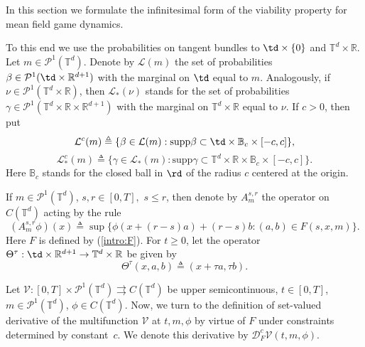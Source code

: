 \documentclass[a4paper,12pt]{article}
\newcommand{\rdp}{\mathbb{R}^{d+1}}
\newcommand{\tdr}{\mathbb{T}^{d}\times\mathbb{R}}
\newcommand{\ptd}{\mathcal{P}^1(\mathbb{T}^d)}
\begin{document}
In this section we formulate the infinitesimal form of the viability property for mean field game dynamics.

To this end we use the probabilities on tangent bundles to $\td\times\{0\}$ and $\tdr$. Let $m\in\ptd$. Denote by $\mathcal{L}(m)$ the set of probabilities $\beta\in\mathcal{P}^1(\td\times\rdp)$ with the marginal on $\td$ equal to $m$. Analogously, if $\nu\in\mathcal{P}^1(\tdr)$, then $\mathcal{L}_*(\nu)$ stands for the set of probabilities $\gamma\in\mathcal{P}^1(\tdr\times \rdp)$ with the marginal on $\tdr$ equal to $\nu$. If $c>0$, then put 
\begin{equation}\label{intro:L_c}
\mathcal{L}^c(m)\triangleq \{\beta\in\mathcal{L}(m):\mathrm{supp}\beta\subset \td\times \mathbb{B}_c\times [-c,c]\},
\end{equation} 
\begin{equation}\label{intro:L_star_c}
\mathcal{L}^c_*(m)\triangleq \{\gamma\in\mathcal{L}_*(m):\mathrm{supp}\gamma\subset \tdr\times \mathbb{B}_c\times [-c,c]\}.
\end{equation} 
Here $\mathbb{B}_c$ stands for the closed ball in $\rd$ of  the radius $c$ centered at the origin. 

If $m\in\ptd$, $s,r\in [0,T], $ $s\leq r$, then denote by $A^{s,r}_m$ the operator  on $C(\mathbb{T}^d)$ acting by the rule
\begin{equation}\label{intro:A_Bellman}
(A^{s,r}_{m}\phi)(x)\triangleq \sup\{\phi(x+(r-s) a)+(r-s) b:(a,b)\in F(s,x,m)\}. 
\end{equation} Here $F$ is defined by (\ref{intro:F}). For $t\geq 0$, let the operator $\Theta^\tau:\td\times\rdp\rightarrow\tdr $ be given by
\begin{equation}\label{intro:Theta}
\Theta^\tau(x,a,b)\triangleq (x+\tau a,\tau b). 
\end{equation}



Let $\mathcal{V}:[0,T]\times\ptd\rightrightarrows C(\mathbb{T}^d)$ be upper semicontinuous, $t\in [0,T]$, $m\in \ptd$, $\phi\in C(\mathbb{T}^d)$. Now, we turn to the definition of set-valued derivative of the multifunction $\mathcal{V}$ at $t,m,\phi$ by virtue of $F$ under constraints determined by constant~$c$. We denote this derivative by  $\mathcal{D}^c_F\mathcal{V}(t,m,\phi)$. 
\end{document}
